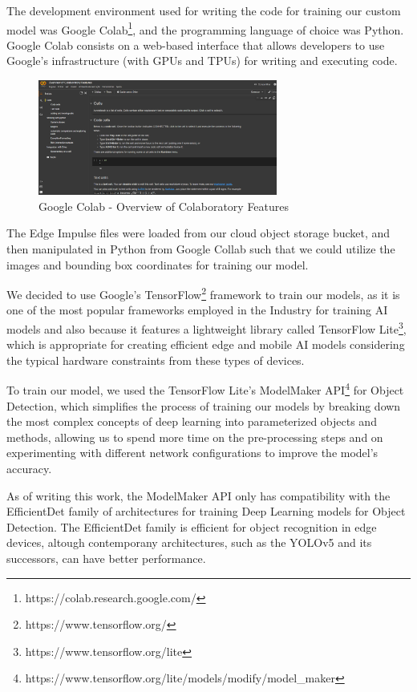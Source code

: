 \documentclass[openright]{normas-utf-tex} %
\begin{document}
The development environment used for writing the code for training our custom model
was Google Colab\footnote{https://colab.research.google.com/}, and the programming language 
of choice was Python. 
Google Colab consists on a web-based interface that allows developers
to use Google's infrastructure (with GPUs and TPUs) for writing and executing code.

\begin{figure}[H]
	\centering
	\includegraphics[width=0.7\textwidth]{./images/google-colab.png}
	\caption[Google Colab - Overview of Colaboratory Features]{Google Colab - Overview of Colaboratory Features}
    \label{fig:diff}
\end{figure}

The Edge Impulse files were loaded from our cloud object storage bucket, and then manipulated in Python
from Google Collab such that we could utilize the images and bounding box coordinates for training
our model.

We decided to use Google's TensorFlow\footnote{https://www.tensorflow.org/} framework to train our 
models, as it is one of the most popular frameworks employed in the Industry for training AI models
and also because it features a lightweight library called TensorFlow Lite\footnote{https://www.tensorflow.org/lite}, 
which is appropriate for creating efficient edge and mobile AI models considering the 
typical hardware constraints from these types of devices.

To train our model, we used the TensorFlow Lite's ModelMaker API\footnote{https://www.tensorflow.org/lite/models/modify/model\_maker} 
for Object Detection, which simplifies the process of training our models by breaking down the most
complex concepts of deep learning into parameterized objects and methods, allowing us to spend
more time on the pre-processing steps and on experimenting with different network configurations
to improve the model's accuracy. 

As of writing this work, the ModelMaker API only has compatibility
with the EfficientDet family of architectures \cite{Mingxing2020} for training
Deep Learning models for Object Detection. The EfficientDet family is efficient
for object recognition in edge devices, altough contemporany architectures,
such as the YOLOv5 and its successors, can have better performance.
\end{document}
